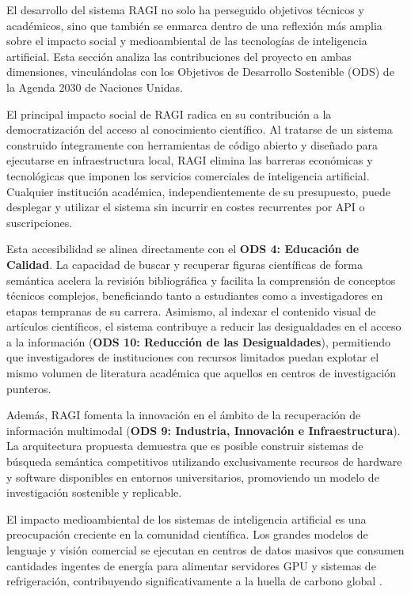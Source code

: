 \documentclass[../main.tex]{subfiles}
\begin{document}
El desarrollo del sistema RAGI no solo ha perseguido objetivos técnicos y académicos, sino que también se enmarca dentro de una reflexión más amplia sobre el impacto social y medioambiental de las tecnologías de inteligencia artificial. Esta sección analiza las contribuciones del proyecto en ambas dimensiones, vinculándolas con los Objetivos de Desarrollo Sostenible (ODS) de la Agenda 2030 de Naciones Unidas.

El principal impacto social de RAGI radica en su contribución a la democratización del acceso al conocimiento científico. Al tratarse de un sistema construido íntegramente con herramientas de código abierto y diseñado para ejecutarse en infraestructura local, RAGI elimina las barreras económicas y tecnológicas que imponen los servicios comerciales de inteligencia artificial. Cualquier institución académica, independientemente de su presupuesto, puede desplegar y utilizar el sistema sin incurrir en costes recurrentes por API o suscripciones.

Esta accesibilidad se alinea directamente con el \textbf{ODS 4: Educación de Calidad}. La capacidad de buscar y recuperar figuras científicas de forma semántica acelera la revisión bibliográfica y facilita la comprensión de conceptos técnicos complejos, beneficiando tanto a estudiantes como a investigadores en etapas tempranas de su carrera. Asimismo, al indexar el contenido visual de artículos científicos, el sistema contribuye a reducir las desigualdades en el acceso a la información (\textbf{ODS 10: Reducción de las Desigualdades}), permitiendo que investigadores de instituciones con recursos limitados puedan explotar el mismo volumen de literatura académica que aquellos en centros de investigación punteros.

Además, RAGI fomenta la innovación en el ámbito de la recuperación de información multimodal (\textbf{ODS 9: Industria, Innovación e Infraestructura}). La arquitectura propuesta demuestra que es posible construir sistemas de búsqueda semántica competitivos utilizando exclusivamente recursos de hardware y software disponibles en entornos universitarios, promoviendo un modelo de investigación sostenible y replicable.

El impacto medioambiental de los sistemas de inteligencia artificial es una preocupación creciente en la comunidad científica. Los grandes modelos de lenguaje y visión comercial se ejecutan en centros de datos masivos que consumen cantidades ingentes de energía para alimentar servidores GPU y sistemas de refrigeración, contribuyendo significativamente a la huella de carbono global \cite{touvron2023}.
\end{document}
